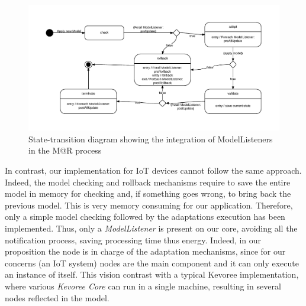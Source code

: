 \begin{figure}[]
	\centering
	\includegraphics[width=1\columnwidth]{chapters/modelsAtRuntimeContiki.images/ModelListenerStateChart.pdf}
	\caption{State-transition diagram showing the integration of ModelListeners in the M@R process}
	\label{fig:MAR_modelListener}
\end{figure}

In contrast, our implementation for IoT devices cannot follow the same approach.
Indeed, the model checking and rollback mechanisms require to save the entire model in memory for checking and, if something goes wrong, to bring back the previous model.
This is very memory consuming for our application.
Therefore, only a simple model checking followed by the adaptations execution has been implemented.
Thus, only a \textit{ModelListener} is present on our core, avoiding all the notification process, saving processing time thus energy.
Indeed, in our proposition the node is in charge of the adaptation mechanisms, since for our concerns (an IoT system) nodes are the main component and it can only execute an instance of itself.
This vision contrast with a typical Kevoree implementation, where various \textit{Kevoree Core} can run in a single machine, resulting in several nodes reflected in the model.




